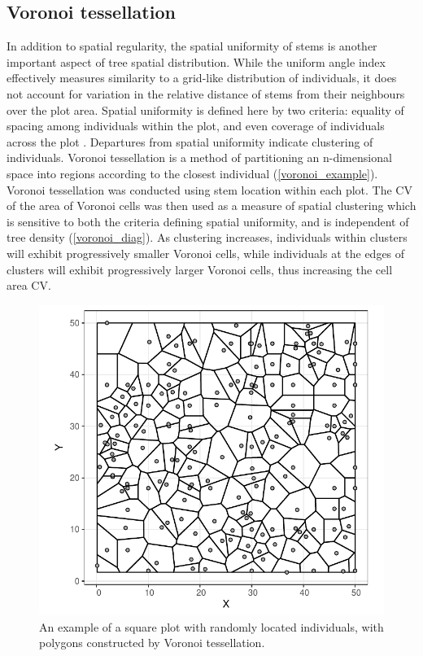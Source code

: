 \documentclass[11pt,a4paper]{article}
\begin{document}
\subsection{Voronoi tessellation}

In addition to spatial regularity, the spatial uniformity of stems is another important aspect of tree spatial distribution. While the uniform angle index effectively measures similarity to a grid-like distribution of individuals, it does not account for variation in the relative distance of stems from their neighbours over the plot area. Spatial uniformity is defined here by two criteria: equality of spacing among individuals within the plot, and even coverage of individuals across the plot \citep{Ong2012}. Departures from spatial uniformity indicate clustering of individuals. Voronoi tessellation is a method of partitioning an n-dimensional space into regions according to the closest individual (\autoref{voronoi_example}). Voronoi tessellation was conducted using stem location within each plot. The CV of the area of Voronoi cells was then used as a measure of spatial clustering which is sensitive to both the criteria defining spatial uniformity, and is independent of tree density (\autoref{voronoi_diag}). As clustering increases, individuals within clusters will exhibit progressively smaller Voronoi cells, while individuals at the edges of clusters will exhibit progressively larger Voronoi cells, thus increasing the cell area CV.

\begin{figure}
\centering
	\includegraphics[width=0.6\linewidth]{voronoi_example}
	\caption{An example of a square plot with \wiki{} randomly located individuals, with polygons constructed by Voronoi tessellation.}
	\label{voronoi_example}
\end{figure}
\end{document}
